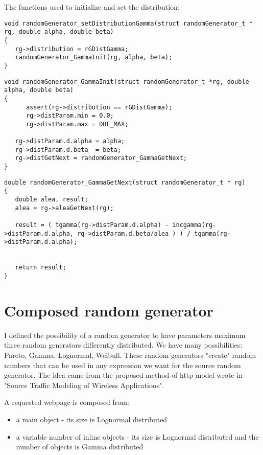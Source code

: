 The functions used to initialize and set the distribution:
\begin{verbatim}
void randomGenerator_setDistributionGamma(struct randomGenerator_t * rg, double alpha, double beta)
{
   rg->distribution = rGDistGamma;
   randomGenerator_GammaInit(rg, alpha, beta);
} 
\end{verbatim}


\begin{verbatim}
void randomGenerator_GammaInit(struct randomGenerator_t *rg, double alpha, double beta)
{
      assert(rg->distribution == rGDistGamma);   
      rg->distParam.min = 0.0;
      rg->distParam.max = DBL_MAX;
  
   rg->distParam.d.alpha = alpha;
   rg->distParam.d.beta  = beta; 
   rg->distGetNext = randomGenerator_GammaGetNext;
}
\end{verbatim}

\begin{verbatim}
double randomGenerator_GammaGetNext(struct randomGenerator_t * rg)
{
   double alea, result;
   alea = rg->aleaGetNext(rg);

   result = ( tgamma(rg->distParam.d.alpha) - incgamma(rg->distParam.d.alpha, rg->distParam.d.beta/alea ) ) / tgamma(rg->distParam.d.alpha); 
  
  
   return result;
}
\end{verbatim}

\section{Composed random generator}
\label{composed_rg}
   I defined the possibility of a random generator to have parameters maximum three random generators differently distributed. We have many possibilities: Pareto, Gamma, Lognormal, Weibull. These random generators "create" random numbers that can be used in any expression we want for the source random generator.
The idea came from the proposed method of http model wrote in "Source Traffic Modeling of Wireless Applications".

A requested webpage is composed from:
\begin{itemize}
\item{a main object} - its size is Lognormal distributed
\item{a variable number of inline objects} - its size is Lognormal distributed and the number of objects is Gamma distributed
\end{itemize}


